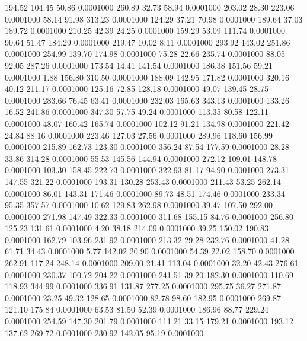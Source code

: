  194.52  104.45   50.86   0.0001000
 260.89   32.73   58.94   0.0001000
 203.02   28.30  223.06   0.0001000
  58.14   91.98  313.23   0.0001000
 124.29   37.21   70.98   0.0001000
 189.64   37.03  189.72   0.0001000
 210.25   42.39   24.25   0.0001000
 159.29   53.09  111.74   0.0001000
  90.64   51.47  184.29   0.0001000
 219.47   10.02    8.11   0.0001000
 293.92  143.02  251.86   0.0001000
 254.99  139.70  174.98   0.0001000
  75.28   22.66  235.74   0.0001000
  88.05   92.05  287.26   0.0001000
 173.54   14.41  141.54   0.0001000
 186.38  151.56   59.21   0.0001000
   1.88  156.80  310.50   0.0001000
 188.09  142.95  171.82   0.0001000
 320.16   40.12  211.17   0.0001000
 125.16   72.85  128.18   0.0001000
  49.07  139.45   28.75   0.0001000
 283.66   76.45   63.41   0.0001000
 232.03  165.63  343.13   0.0001000
 133.26   16.52  241.86   0.0001000
 347.30   57.75   49.24   0.0001000
 113.35   80.58  122.11   0.0001000
  48.07  160.42  165.74   0.0001000
 102.12   91.21  134.98   0.0001000
 221.42   24.84   88.16   0.0001000
 223.46  127.03   27.56   0.0001000
 289.96  118.60  156.99   0.0001000
 215.89  162.73  123.30   0.0001000
 356.24   87.54  177.59   0.0001000
  28.28   33.86  314.28   0.0001000
  55.53  145.56  144.94   0.0001000
 272.12  109.01  148.78   0.0001000
 103.30  158.45  222.73   0.0001000
 322.93   81.17   94.90   0.0001000
 273.31  147.55  321.22   0.0001000
 193.31  130.28  253.43   0.0001000
 211.43   53.25  262.14   0.0001000
  86.01  143.31  171.46   0.0001000
  89.73   48.51  174.46   0.0001000
 233.34   95.35  357.57   0.0001000
  10.62  129.83  262.98   0.0001000
  39.47  107.50  292.00   0.0001000
 271.98  147.49  322.33   0.0001000
 311.68  155.15   84.76   0.0001000
 256.80  125.23  131.61   0.0001000
   4.20   38.18  214.09   0.0001000
  39.25  150.02  190.83   0.0001000
 162.79  103.96  231.92   0.0001000
 213.32   29.28  232.76   0.0001000
  41.28   61.71   34.43   0.0001000
   5.77  142.02   20.90   0.0001000
  54.39   22.02  158.70   0.0001000
 262.91  117.24  248.14   0.0001000
 209.00   21.41  113.04   0.0001000
  32.20   42.43  276.61   0.0001000
 230.37  100.72  204.22   0.0001000
 241.51   39.20  182.30   0.0001000
 110.69  118.93  344.99   0.0001000
 336.91  131.87  277.25   0.0001000
 295.75   36.27  271.87   0.0001000
  23.25   49.32  128.65   0.0001000
  82.78   98.60  182.95   0.0001000
 269.87  121.10  175.84   0.0001000
  63.53   81.50   52.39   0.0001000
 186.96   88.77  229.24   0.0001000
 254.59  147.30  201.79   0.0001000
 111.21   33.15  179.21   0.0001000
 193.12  137.62  269.72   0.0001000
 230.92  142.05   95.19   0.0001000
